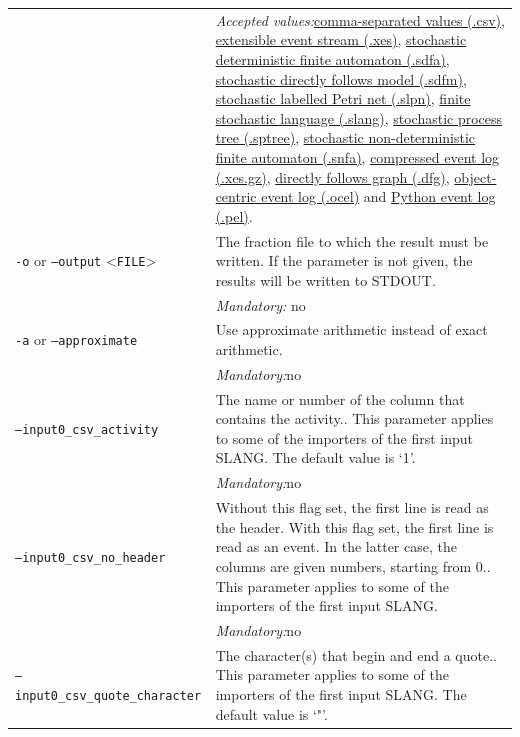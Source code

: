 {\begin{tabularx}{\linewidth}{lX}
&\textit{Accepted values:}\quad \hyperref[filehandler:comma-separated values]{comma-separated values (.csv)}, \hyperref[filehandler:extensible event stream]{extensible event stream (.xes)}, \hyperref[filehandler:stochastic deterministic finite automaton]{stochastic deterministic finite automaton (.sdfa)}, \hyperref[filehandler:stochastic directly follows model]{stochastic directly follows model (.sdfm)}, \hyperref[filehandler:stochastic labelled Petri net]{stochastic labelled Petri net (.slpn)}, \hyperref[filehandler:finite stochastic language]{finite stochastic language (.slang)}, \hyperref[filehandler:stochastic process tree]{stochastic process tree (.sptree)}, \hyperref[filehandler:stochastic non-deterministic finite automaton]{stochastic non-deterministic finite automaton (.snfa)}, \hyperref[filehandler:compressed event log]{compressed event log (.xes.gz)}, \hyperref[filehandler:directly follows graph]{directly follows graph (.dfg)}, \hyperref[filehandler:object-centric event log]{object-centric event log (.ocel)} and \hyperref[filehandler:Python event log]{Python event log (.pel)}.\\
\texttt{-o} or \texttt{--output} <\texttt{FILE}> &
The fraction file to which the result must be written. If the parameter is not given, the results will be written to STDOUT.\\
&\textit{Mandatory:} \quad no\\
\texttt{-a} or \texttt{--approximate} & Use approximate arithmetic instead of exact arithmetic.\\
&\textit{Mandatory:}\quad no\\
\texttt{--input0\_csv\_activity} & The name or number of the column that contains the activity.. This parameter applies to some of the importers of the first input SLANG. The default value is `1'.\\
&\textit{Mandatory:}\quad no\\
\texttt{--input0\_csv\_no\_header} & Without this flag set, the first line is read as the header. 
    With this flag set, the first line is read as an event. In the latter case, the columns are given numbers, starting from 0.. This parameter applies to some of the importers of the first input SLANG. \\
&\textit{Mandatory:}\quad no\\
\texttt{--input0\_csv\_quote\_character} & The character(s) that begin and end a quote.. This parameter applies to some of the importers of the first input SLANG. The default value is `"'.\\

\end{tabularx}}
